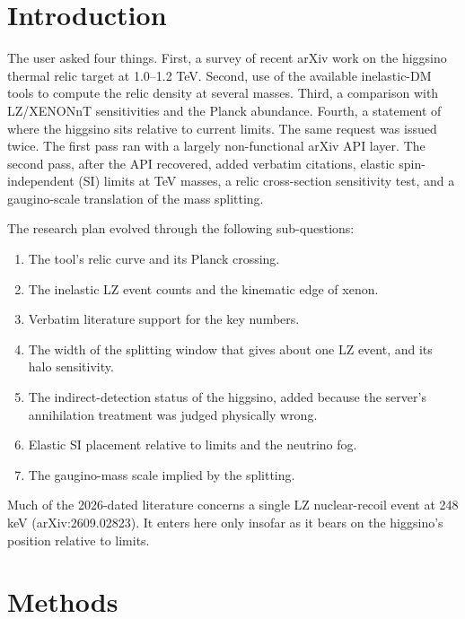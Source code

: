 \documentclass[11pt,a4paper]{article}
\begin{document}
\section{Introduction}
The user asked four things. First, a survey of recent arXiv work on the higgsino thermal relic target at 1.0--1.2 TeV. Second, use of the available inelastic-DM tools to compute the relic density at several masses. Third, a comparison with LZ/XENONnT sensitivities and the Planck abundance. Fourth, a statement of where the higgsino sits relative to current limits. The same request was issued twice. The first pass ran with a largely non-functional arXiv API layer. The second pass, after the API recovered, added verbatim citations, elastic spin-independent (SI) limits at TeV masses, a relic cross-section sensitivity test, and a gaugino-scale translation of the mass splitting.

The research plan evolved through the following sub-questions:
\begin{enumerate}
\item The tool's relic curve and its Planck crossing.
\item The inelastic LZ event counts and the kinematic edge of xenon.
\item Verbatim literature support for the key numbers.
\item The width of the splitting window that gives about one LZ event, and its halo sensitivity.
\item The indirect-detection status of the higgsino, added because the server's annihilation treatment was judged physically wrong.
\item Elastic SI placement relative to limits and the neutrino fog.
\item The gaugino-mass scale implied by the splitting.
\end{enumerate}

Much of the 2026-dated literature concerns a single LZ nuclear-recoil event at 248 keV (arXiv:2609.02823). It enters here only insofar as it bears on the higgsino's position relative to limits.

\section{Methods}
\end{document}
